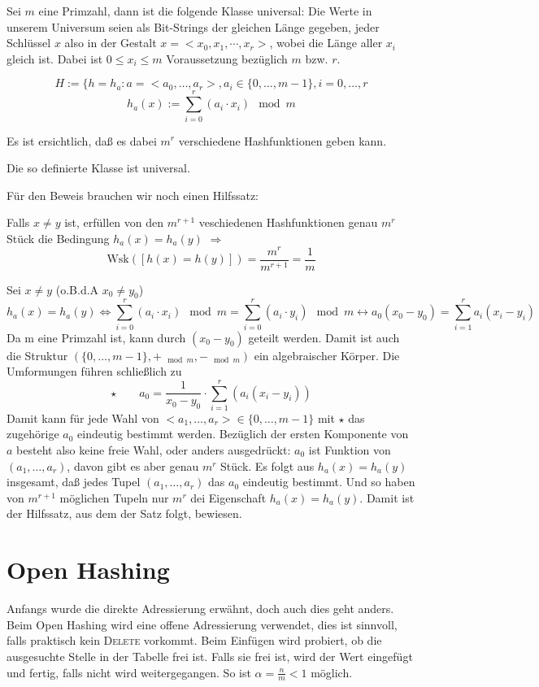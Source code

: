 Sei $m$ eine Primzahl, dann ist die folgende Klasse universal:
Die Werte in unserem Universum seien als Bit-Strings der gleichen Länge gegeben, jeder Schlüssel $x$ also in der
Gestalt $x=<x_0, x_1, \cdots, x_r>$, wobei die Länge aller $x_i$ gleich ist.  Dabei ist $0\leq x_i\leq m$ Voraussetzung
bezüglich $m$ bzw. $r$.
\begin{definition}
\[H:=\{h=h_a : a=<a_0, \ldots, a_r>, a_i \in \{0, \ldots, m-1\}, i=0, \ldots, r\]
\[h_a(x):=\sum_{i=0}^r (a_i \cdot x_i) \mod m\]
\end{definition}
Es ist ersichtlich, daß es dabei $m^r$ verschiedene Hashfunktionen geben kann.

\begin{satz}
Die so definierte Klasse ist universal.
\end{satz}
Für den Beweis brauchen wir noch einen Hilfssatz:
\begin{satz}[Hilfssatz]
Falls $x\neq y$ ist, erfüllen von den $m^{r+1}$ veschiedenen Hashfunktionen genau $m^r$ Stück die Bedingung
$h_a(x)=h_a(y)$ $\Rightarrow$ \[\mbox{Wsk}([h(x)=h(y)])=\frac{m^r}{m^{r+1}}=\frac{1}{m}\]
\end{satz}
\begin{beweis}
Sei $x\neq y$ (o.B.d.A $x_0 \neq y_0$)
\[h_a(x)=h_a(y) \Leftrightarrow \sum_{i=0}^r (a_i \cdot x_i)\!\! \mod m=\sum_{i=0}^r (a_i \cdot y_i)\!\! \mod m \leftrightarrow
a_0(x_0-y_0)=\sum_{i=1}^r a_i (x_i- y_i)\]
Da m eine Primzahl ist, kann durch $(x_0-y_0)$ geteilt werden. Damit ist auch die Struktur $(\{0, \ldots, m-1\}, +_{\mod
m}, -_{\mod m})$ ein algebraischer Körper. Die Umformungen führen schließlich zu \[\star  \qquad 
a_0=\frac{1}{x_0-y_0} \cdot \sum_{i=1}^r (a_i (x_i- y_i))\]
Damit kann für jede Wahl von $<a_1, \ldots, a_r> \in \{0, \ldots, m-1\}$ mit $\star$ das zugehörige $a_0$ eindeutig
bestimmt werden. Bezüglich der ersten Komponente von $a$ besteht also keine freie Wahl, oder anders ausgedrückt: $a_0$
ist Funktion von $(a_1, \ldots, a_r)$, davon gibt es aber genau $m^r$ Stück. Es folgt aus $h_a(x)=h_a(y)$ insgesamt,
daß jedes Tupel $(a_1, \ldots, a_r)$ das $a_0$ eindeutig bestimmt. Und so haben von $m^{r+1}$ möglichen Tupeln nur
$m^r$ dei Eigenschaft $h_a(x)=h_a(y)$. Damit ist der Hilfssatz, aus dem der Satz folgt, bewiesen.
\end{beweis}

\section{Open Hashing}
Anfangs wurde die direkte Adressierung erwähnt, doch auch dies geht anders. Beim Open Hashing wird eine offene
Adressierung verwendet, dies ist sinnvoll, falls praktisch kein \textsc{Delete} vorkommt. Beim Einfügen wird probiert,
ob die ausgesuchte Stelle in der Tabelle frei ist. Falls sie frei ist, wird der Wert eingefügt und fertig, falls nicht
wird weitergegangen. So ist $\alpha=\frac{n}{m}<1$ möglich.


